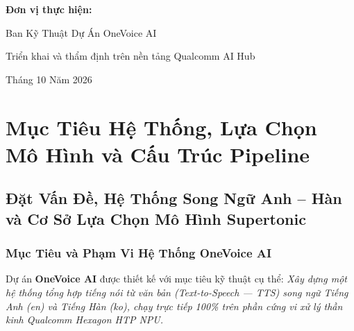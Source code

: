 \documentclass[11pt,a4paper,oneside,table]{report}
\begin{document}
\begin{titlepage}
    \vfill
    \vspace{0.5cm}

    {\bfseries\sffamily Đơn vị thực hiện:}\par
    {\large\sffamily Ban Kỹ Thuật Dự Án OneVoice AI\par}
    \vspace{0.2cm}
    {\small\sffamily Triển khai và thẩm định trên nền tảng Qualcomm AI Hub\par}
    \vspace{0.6cm}
    {\small\sffamily Tháng 10 Năm 2026\par}
    \vspace{0.8cm}
\end{titlepage}

\setcounter{page}{1}

\clearpage
\tableofcontents
\clearpage

\listoffigures
\listoftables
\clearpage

\setcounter{page}{1}

\part{Mục Tiêu Hệ Thống, Lựa Chọn Mô Hình và Cấu Trúc Pipeline}

\chapter{Đặt Vấn Đề, Hệ Thống Song Ngữ Anh -- Hàn và Cơ Sở Lựa Chọn Mô Hình Supertonic}
\label{chap:introduction}

\section{Mục Tiêu và Phạm Vi Hệ Thống OneVoice AI}
\label{sec:system_scope}

Dự án \textbf{OneVoice AI} được thiết kế với mục tiêu kỹ thuật cụ thể: \textit{Xây dựng một hệ thống tổng hợp tiếng nói từ văn bản (Text-to-Speech --- TTS) song ngữ Tiếng Anh (en) và Tiếng Hàn (ko), chạy trực tiếp 100\% trên phần cứng vi xử lý thần kinh Qualcomm Hexagon HTP NPU.}
\end{document}
